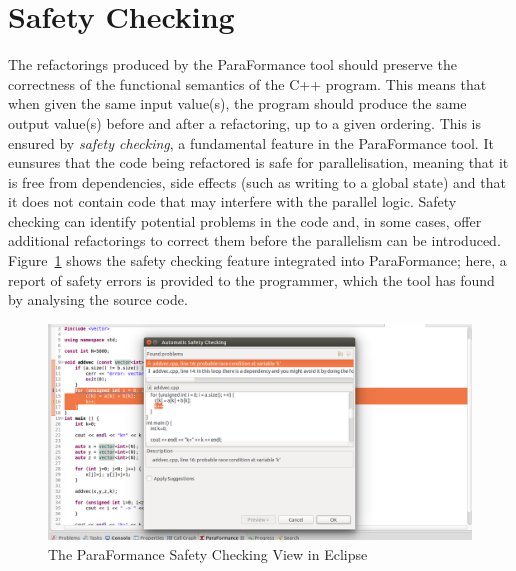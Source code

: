 \section {Safety Checking}
\label{safety-checking}
The refactorings produced by the ParaFormance tool should preserve the correctness of the functional semantics of the C++ program. This means that when given the same input value(s), the program should produce the same output value(s) before and after a refactoring, up to a given ordering. This is ensured by \emph{safety checking}, a fundamental feature in the ParaFormance tool. It eunsures that the code being refactored is safe for parallelisation, meaning that it is free from dependencies, side effects (such as writing to a global state) and that it does not contain code that may interfere with the parallel logic. Safety checking can identify potential problems in the code and, in some cases, offer additional refactorings to correct them before the parallelism can be introduced.
%
Figure~\ref{fig:safety1} shows the safety checking feature integrated into ParaFormance; here, a report of safety errors is provided to the programmer, which the tool has found by analysing the source code.

\begin{figure}
\centering
\includegraphics[scale=0.26]{figures/pf-safety-auto-dialog.png}
\caption{The ParaFormance Safety Checking View in Eclipse}
\label{fig:safety1}
\end{figure}

